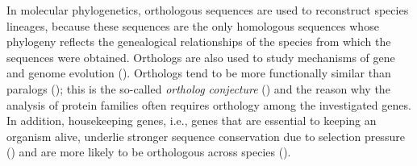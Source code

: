 In molecular phylogenetics, orthologous sequences are used to reconstruct
species lineages, because these sequences are the only homologous sequences
whose phylogeny reflects the genealogical relationships of the species from
which the sequences were obtained. Orthologs are also used to study mechanisms
of gene and genome evolution (\cite{dessimoz2012}). Orthologs tend to be more
functionally similar than paralogs (\cite{altenhoff2012}); this is the so-called
\emph{ortholog conjecture} (\cite{tatusov1997}) and the reason why the analysis
of protein families often requires orthology among the investigated genes. In
addition, housekeeping genes, i.e., genes that are essential to keeping an
organism alive, underlie stronger sequence conservation due to selection
pressure (\cite{she2009}) and are more likely to be orthologous across species
(\cite{waterhouse2011}). 

